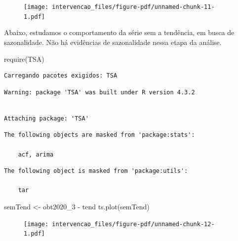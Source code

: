 \documentclass[
  letterpaper,
  DIV=11,
  numbers=noendperiod]{scrartcl}
\newenvironment{Shaded}{\begin{snugshade}}{\end{snugshade}}
\newcommand{\FunctionTok}[1]{\textcolor[rgb]{0.28,0.35,0.67}{#1}}
\newcommand{\NormalTok}[1]{\textcolor[rgb]{0.00,0.23,0.31}{#1}}
\newcommand{\OtherTok}[1]{\textcolor[rgb]{0.00,0.23,0.31}{#1}}
\newcommand{\SpecialCharTok}[1]{\textcolor[rgb]{0.37,0.37,0.37}{#1}}
\theoremstyle{plain}
\theoremstyle{plain}
\theoremstyle{definition}
\theoremstyle{definition}
\theoremstyle{remark}
\begin{document}
\begin{figure}[H]

{\centering \texttt{[image: intervencao\_files/figure-pdf/unnamed-chunk-11-1.pdf]}

}

\end{figure}

Abaixo, estudamos o comportamento da série sem a tendência, em busca de
sazonalidade. Não há evidências de sazonalidade nessa etapa da análise.

\begin{Shaded}
\begin{Highlighting}[]
\FunctionTok{require}\NormalTok{(TSA)}
\end{Highlighting}
\end{Shaded}

\begin{verbatim}
Carregando pacotes exigidos: TSA
\end{verbatim}

\begin{verbatim}
Warning: package 'TSA' was built under R version 4.3.2
\end{verbatim}

\begin{verbatim}

Attaching package: 'TSA'
\end{verbatim}

\begin{verbatim}
The following objects are masked from 'package:stats':

    acf, arima
\end{verbatim}

\begin{verbatim}
The following object is masked from 'package:utils':

    tar
\end{verbatim}

\begin{Shaded}
\begin{Highlighting}[]
\NormalTok{semTend }\OtherTok{\textless{}{-}}\NormalTok{ obt2020\_3 }\SpecialCharTok{{-}}\NormalTok{ tend}
\FunctionTok{ts.plot}\NormalTok{(semTend)}
\end{Highlighting}
\end{Shaded}

\begin{figure}[H]

{\centering \texttt{[image: intervencao\_files/figure-pdf/unnamed-chunk-12-1.pdf]}

}

\end{figure}
\end{document}
